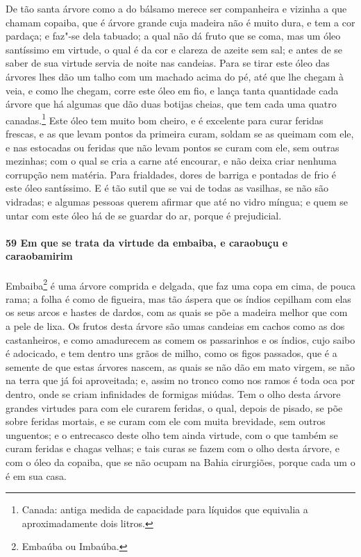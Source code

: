\begin{linenumbers}
De tão santa árvore como a do bálsamo merece ser companheira e vizinha a que chamam
copaiba, que é árvore grande cuja madeira não é muito dura, e tem a cor pardaça; e faz"-se
dela tabuado; a qual não dá fruto que se coma, mas um óleo
santíssimo em virtude, o qual é da cor e clareza de azeite sem sal; e antes de se saber de
sua virtude servia de 
noite nas candeias. Para se tirar este óleo das árvores lhes dão um talho com um machado
acima do pé, até que lhe chegam à veia, e como lhe chegam, corre este óleo em fio, e lança
tanta quantidade cada árvore que há algumas que dão duas botijas cheias, que tem cada uma
quatro canadas.\footnote{ Canada: antiga medida de capacidade para líquidos que equivalia
a aproximadamente dois litros.} Este óleo tem muito bom cheiro, e é excelente para curar
feridas frescas, e as que levam pontos da primeira curam, soldam se as queimam com ele, e
nas estocadas ou feridas que não levam pontos se curam com ele, sem outras mezinhas; com o
qual se cria a carne até encourar, e não deixa criar nenhuma corrupção nem matéria. Para
frialdades, dores de barriga e pontadas de frio é este óleo santíssimo. E é tão sutil que
se vai de todas as vasilhas, se não são vidradas; e algumas pessoas querem afirmar que até
no vidro míngua; e quem se untar com este óleo há de se guardar do ar, porque é
prejudicial.

\paragraph{59 Em que se trata da virtude da embaiba, e caraobuçu e caraobamirim}\quad
Embaiba\footnote{ Embaúba ou Imbaúba.} é uma árvore comprida e delgada, que faz uma copa
em cima, de pouca rama; a folha é como de figueira, mas tão áspera que os índios cepilham
com elas os seus arcos e hastes de dardos, com as quais se põe a madeira melhor que com a
pele de lixa. Os frutos desta árvore são umas candeias em cachos como as dos castanheiros,
e como amadurecem as comem os passarinhos e os índios, cujo saibo é adocicado, e tem
dentro uns grãos de milho, como os figos passados, que é a semente de que estas árvores
nascem, as quais se não dão em mato virgem, se não na terra que já foi aproveitada; e,
assim no tronco como nos ramos é toda oca por dentro, onde se criam infinidades de
formigas miúdas. Tem o olho desta árvore grandes virtudes para com ele curarem feridas, o
qual, depois de pisado, se põe sobre feridas mortais, e se curam com ele com muita
brevidade, sem outros unguentos; e o entrecasco deste olho tem ainda virtude, com o que
também se curam feridas e chagas velhas; e tais curas se fazem com o olho desta árvore, e
com o óleo da copaiba, que se não ocupam na Bahia cirurgiões, porque cada um o é em sua
casa.


\end{linenumbers}
